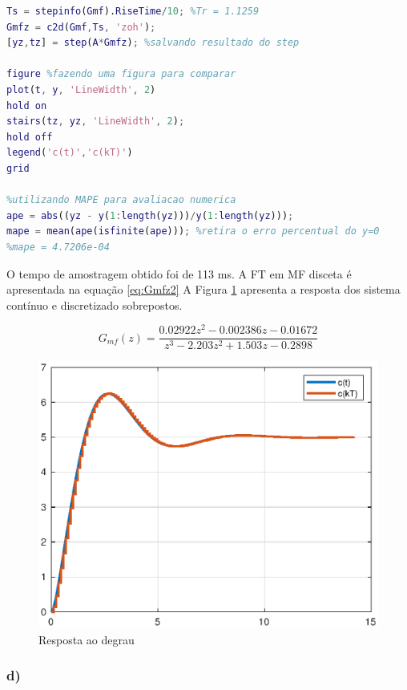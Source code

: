     \begin{lstlisting}[language=Matlab,label=Q2C,caption= Análise da estabilidade]
Ts = stepinfo(Gmf).RiseTime/10; %Tr = 1.1259
Gmfz = c2d(Gmf,Ts, 'zoh');
[yz,tz] = step(A*Gmfz); %salvando resultado do step

figure %fazendo uma figura para comparar
plot(t, y, 'LineWidth', 2)
hold on
stairs(tz, yz, 'LineWidth', 2);
hold off
legend('c(t)','c(kT)')
grid

%utilizando MAPE para avaliacao numerica
ape = abs((yz - y(1:length(yz)))/y(1:length(yz))); 
mape = mean(ape(isfinite(ape))); %retira o erro percentual do y=0
%mape = 4.7206e-04
    \end{lstlisting}

    O tempo de amostragem obtido foi de 113 ms. A FT em MF disceta é apresentada na equação \ref{eq:Gmfz2}
    A Figura \ref{fig:Stepctds2} apresenta a resposta dos sistema contínuo e discretizado sobrepostos. 

    \begin{equation}
        G_{mf}(z) = \frac{0.02922 z^2 - 0.002386 z - 0.01672}{z^3 - 2.203 z^2 + 1.503 z - 0.2898}
        \label{eq:Gmfz2}
    \end{equation}

    \begin{figure}[!ht]
        \centering
        \includegraphics[width = 0.75\linewidth]{Figuras/ProblemasPI/Problema2/stepContinuoDiscreto.eps}
        \caption{Resposta ao degrau}
        \label{fig:Stepctds2}                   
    \end{figure}

    \subsubsection*{d)}

